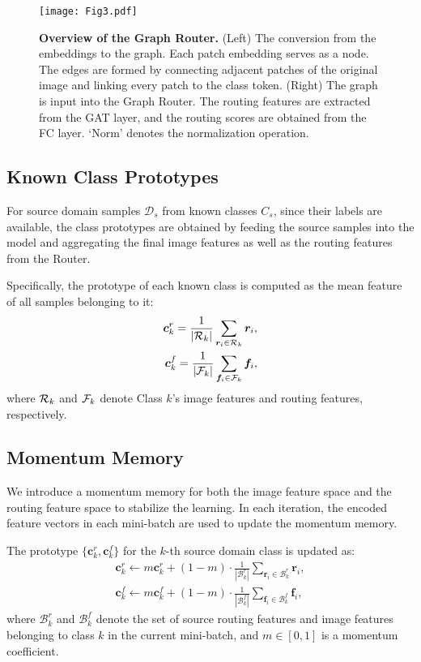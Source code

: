 \documentclass[10pt,twocolumn,letterpaper]{article}
\begin{document}
\begin{figure}[htpb]    \centering
  \vspace{-0.12in}
  \texttt{[image: Fig3.pdf]}
  \caption{\textbf{Overview of the Graph Router.} (Left) The conversion from the embeddings to the graph. Each patch embedding serves as a node. The edges are formed by connecting adjacent patches of the original image and linking every patch to the class token. (Right) The graph is input into the Graph Router. The routing features are extracted from the GAT layer, and the routing scores are obtained from the FC layer. `Norm' denotes the normalization operation.}     \label{Fig3} \vspace{-0.15in}
\end{figure}

\subsection{Known Class Prototypes} \label{sec:known}

For source domain samples $\mathcal{D}_s$ from known classes $C_s$, since their labels are available, the class prototypes are obtained by feeding the source samples into the model and aggregating the final image features as well as the routing features from the Router.

Specifically, the prototype of each known class is computed as the mean feature of all samples belonging to it:
\begin{align}
	\bm{c}_{k}^{r} = \frac{1}{|{\cal R}_{k}|}\sum_{\bm{r}_i \in {\cal R}_{k}} \bm{r}_i, \\
    \bm{c}_{k}^{f} = \frac{1}{|{\cal F}_{k}|}\sum_{\bm{f}_i \in {\cal F}_{k}} \bm{f}_i,
\end{align}
where ${\cal R}_{k}$ and ${\cal F}_{k}$ denote Class $k$'s image features and routing features, respectively.

\subsection{Momentum Memory} \label{sec:memory}

We introduce a momentum memory \cite{ge2020selfpaced} for both the image feature space and the routing feature space to stabilize the learning. In each iteration, the encoded feature vectors in each mini-batch are used to update the momentum memory.

The prototype $\{\bm{c}^{r}_k, \bm{c}^{f}_k\}$ for the $k$-th source domain class is updated as:
\begin{align} \label{eq:m_cen}
\bm{c}^{r}_k \leftarrow m \bm{c}^{r}_k + (1-m)\cdot \frac{1}{|\mathcal{B}_k^r|}\sum_{\bm{r}_i \in \mathcal{B}_k^r} \bm{r}_i, \\
\bm{c}^{f}_k \leftarrow m \bm{c}^{f}_k + (1-m)\cdot \frac{1}{|\mathcal{B}_k^f|}\sum_{\bm{f}_i \in \mathcal{B}_k^f} \bm{f}_i,
\end{align}
where $\mathcal{B}_k^r$ and $\mathcal{B}_k^f$ denote the set of source routing features and image features belonging to class $k$ in the current mini-batch, and $m \in [0,1]$ is a momentum coefficient.
\end{document}
